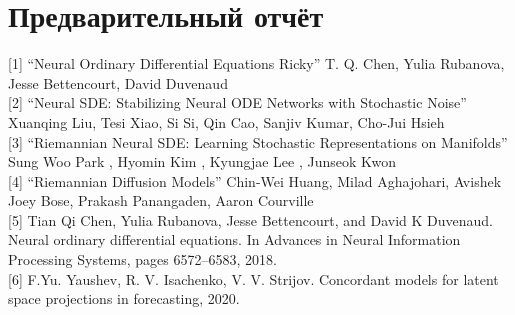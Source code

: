 \documentclass{article}
\begin{document}
\section{Предварительный отчёт}
    




[1] “Neural Ordinary Differential Equations Ricky” T. Q. Chen, Yulia Rubanova, Jesse Bettencourt, David Duvenaud \\

[2] “Neural SDE: Stabilizing Neural ODE Networks with Stochastic Noise” Xuanqing Liu, Tesi Xiao, Si Si, Qin Cao, Sanjiv Kumar, Cho-Jui Hsieh  \\

[3] “Riemannian Neural SDE: Learning Stochastic Representations on Manifolds” Sung Woo Park , Hyomin Kim , Kyungjae Lee , Junseok Kwon \\

[4] “Riemannian Diffusion Models” Chin-Wei Huang, Milad Aghajohari, Avishek Joey Bose, Prakash Panangaden, Aaron Courville \\

[5] Tian Qi Chen, Yulia Rubanova, Jesse Bettencourt, and David K Duvenaud. Neural ordinary differential equations. In Advances in Neural Information Processing Systems, pages 6572–6583, 2018. \\

[6] F.Yu. Yaushev, R. V. Isachenko, V. V. Strijov. Concordant models for latent space projections in forecasting, 2020. \\
\end{document}
